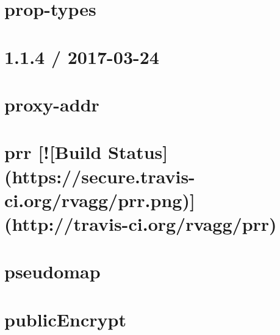 \documentclass[twoside]{book}
\newcommand{\+}{\discretionary{\mbox{\scriptsize$\hookleftarrow$}}{}{}}
\begin{document}
\chapter{prop-\/types}
\label{md__c_1_workspace_demo_src_main_script_node_modules_prop-types__r_e_a_d_m_e}

\chapter{1.1.4 / 2017-\/03-\/24}
\label{md__c_1_workspace_demo_src_main_script_node_modules_proxy-addr__h_i_s_t_o_r_y}

\chapter{proxy-\/addr}
\label{md__c_1_workspace_demo_src_main_script_node_modules_proxy-addr__r_e_a_d_m_e}

\chapter{prr \mbox{[}!\mbox{[}Build Status\mbox{]}(https\+://secure.travis-\/ci.org/rvagg/prr.png)\mbox{]}(http\+://travis-\/ci.org/rvagg/prr)}
\label{md__c_1_workspace_demo_src_main_script_node_modules_prr__r_e_a_d_m_e}

\chapter{pseudomap}
\label{md__c_1_workspace_demo_src_main_script_node_modules_pseudomap__r_e_a_d_m_e}

\chapter{public\+Encrypt}
\label{md__c_1_workspace_demo_src_main_script_node_modules_public-encrypt_readme}

\end{document}
